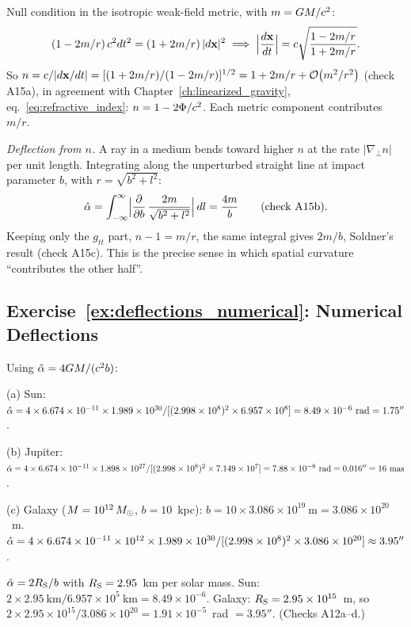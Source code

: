 \begin{derivation}
Null condition in the isotropic weak-field metric, with $m = G
M/c^2$:
\[
    (1 - 2m/r)\,c^2dt^2 = (1 + 2m/r)\,|d\mathbf{x}|^2
    \;\Longrightarrow\;
    \Bigl|\frac{d\mathbf x}{dt}\Bigr| = c\sqrt{\frac{1-2m/r}{1+2m/r}} .
\]
So $n = c/|d\mathbf x/dt| = [(1+2m/r)/(1-2m/r)]^{1/2}
= 1 + 2m/r + \mathcal{O}\!\left(m^2/r^2\right)$ (check A15a), in agreement with Chapter~\ref{ch:linearized_gravity},
eq.~\eqref{eq:refractive_index}: $n = 1 - 2\Phi/c^2$.  Each metric
component contributes $m/r$.

\textit{Deflection from $n$.}  A ray in a medium bends toward higher $n$ at the
rate $|\nabla_\perp n|$ per unit length.  Integrating along the unperturbed
straight line at impact parameter $b$, with $r = \sqrt{b^2+l^2}$:
\[
    \hat{\alpha} = \int_{-\infty}^{\infty}\Bigl|\frac{\partial}{\partial b}\,
    \frac{2m}{\sqrt{b^2+l^2}}\Bigr|\,dl = \frac{4m}{b}
    \qquad(\text{check A15b}).
\]
Keeping only the $g_{tt}$ part, $n - 1 = m/r$, the same integral gives
$2m/b$, Soldner's result (check A15c).  This is the precise sense in which
spatial curvature ``contributes the other half''.
\end{derivation}
\subsection*{Exercise~\ref{ex:deflections_numerical}: Numerical Deflections}

Using $\hat{\alpha} = 4G M / (c^2 b)$:

(a) Sun:
$\hat{\alpha} = 4 \times 6.674 \times 10^{-11} \times 1.989 \times 10^{30}
/ [(2.998 \times 10^{8})^2 \times 6.957 \times 10^{8}]
= 8.49 \times 10^{-6}~\text{rad} = 1.75''$.

(b) Jupiter:
$\hat{\alpha} = 4 \times 6.674 \times 10^{-11} \times 1.898 \times 10^{27}
/ [(2.998 \times 10^{8})^2 \times 7.149 \times 10^{7}]
= 7.88 \times 10^{-8}~\text{rad} = 0.016'' = 16~\text{mas}$.

(c) Galaxy ($M = 10^{12}\,M_{\odot}$, $b = 10$~kpc):
$b = 10 \times 3.086 \times 10^{19}~\text{m} = 3.086 \times 10^{20}$~m.
$\hat{\alpha} = 4 \times 6.674 \times 10^{-11} \times 10^{12} \times
1.989 \times 10^{30} / [(2.998 \times 10^{8})^2 \times
3.086 \times 10^{20}] \approx 3.95''$.


\begin{annotation}
$\hat{\alpha} = 2R_{\mathrm{S}}/b$ with $R_{\mathrm{S}} = 2.95$~km per solar mass.  Sun:
$2\times2.95~\text{km}/6.957\times10^5~\text{km} = 8.49\times10^{-6}$.
Galaxy: $R_{\mathrm{S}} = 2.95\times10^{15}$~m, so
$2\times2.95\times10^{15}/3.086\times10^{20} = 1.91\times10^{-5}$~rad
$= 3.95''$.  (Checks A12a--d.)
\end{annotation}
